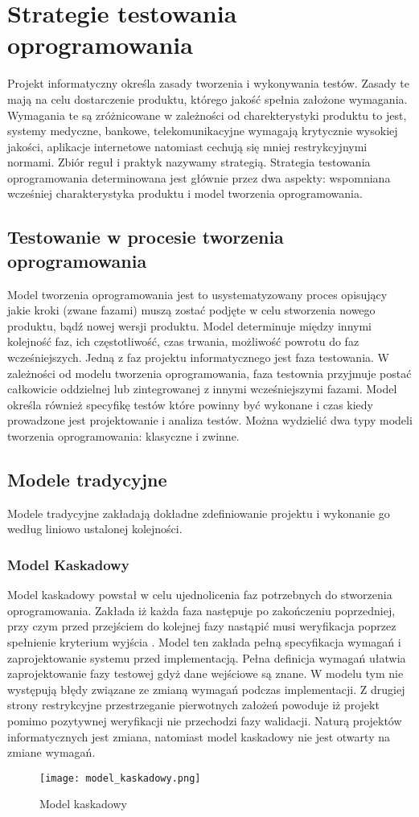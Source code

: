 \chapter{Strategie testowania oprogramowania}
Projekt informatyczny określa zasady tworzenia i wykonywania testów. Zasady te mają na celu dostarczenie produktu, którego jakość spełnia założone wymagania. Wymagania te są zróżnicowane w zależności od charekterystyki produktu to jest, systemy medyczne, bankowe, telekomunikacyjne wymagają krytycznie wysokiej jakości, aplikacje internetowe natomiast cechują się mniej restrykcyjnymi normami. Zbiór reguł i praktyk nazywamy strategią. Strategia testowania oprogramowania determinowana jest głównie przez dwa aspekty: wspomniana wcześniej charakterystyka produktu i model tworzenia oprogramowania. 


\label{cha:strategie testowania}
\section{Testowanie w procesie tworzenia oprogramowania}
\label{sec:testowanieWprocesie}
Model tworzenia oprogramowania jest to usystematyzowany proces opisujący jakie kroki (zwane fazami) muszą zostać podjęte w celu stworzenia nowego produktu, bądź nowej wersji produktu. Model determinuje między innymi kolejność faz, ich częstotliwość, czas trwania, możliwość powrotu do faz wcześniejszych. Jedną z faz projektu informatycznego jest faza testowania. W zależności od modelu tworzenia oprogramowania, faza testownia przyjmuje postać całkowicie oddzielnej lub zintegrowanej z innymi wcześniejszymi fazami. Model określa również specyfikę testów które powinny być wykonane  i czas kiedy prowadzone jest projektowanie i analiza testów.
Można wydzielić dwa typy modeli tworzenia oprogramowania: klasyczne i zwinne.  
\section{Modele tradycyjne}
Modele tradycyjne zakładają dokładne zdefiniowanie projektu i wykonanie go według liniowo ustalonej kolejności.
\subsection{Model Kaskadowy}
Model kaskadowy powstał w celu ujednolicenia faz potrzebnych do stworzenia oprogramowania. Zakłada iż każda faza następuje po zakończeniu poprzedniej, przy czym przed przejściem do kolejnej fazy nastąpić musi weryfikacja poprzez spełnienie kryterium wyjścia \cite{SEaT}. Model ten zakłada pełną specyfikacja wymagań i zaprojektowanie systemu przed implementacją. Pełna definicja wymagań ułatwia zaprojektowanie fazy testowej gdyż dane wejściowe są znane. W modelu tym nie występują błędy związane ze zmianą wymagań podczas implementacji. Z drugiej strony restrykcyjne przestrzeganie pierwotnych założeń powoduje iż projekt pomimo pozytywnej weryfikacji nie przechodzi fazy walidacji. Naturą projektów informatycznych jest zmiana, natomiast model kaskadowy nie jest otwarty na zmiane wymagań. 
\begin{figure}[h]
\centerline{\texttt{[image: model\_kaskadowy.png]}}
\caption{Model kaskadowy}
\label{fig:kaskadowy}
\end{figure}

